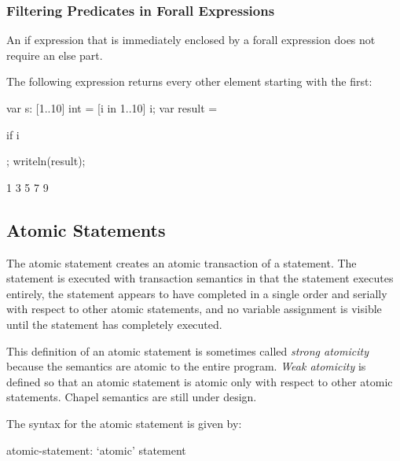 \subsubsection{Filtering Predicates in Forall Expressions}
\label{Filtering_Predicates_Forall}

An if expression that is immediately enclosed by a forall expression
does not require an else part.
\begin{example}
The following expression returns every other element starting with the
first:
\begin{chapelpre}
var s: [1..10] int = [i in 1..10] i;
var result =
\end{chapelpre}
\begin{chapel}
[i in 1..s.numElements] if i %
\end{chapel}
\begin{chapelpost}
;
writeln(result);
\end{chapelpost}
\begin{chapeloutput}
1 3 5 7 9
\end{chapeloutput}
\end{example}

\subsection{Atomic Statements}
\label{Atomic_Transactions}
\label{atomicity}

The atomic statement creates an atomic transaction of a statement. The
statement is executed with transaction semantics in that the statement
executes entirely, the statement appears to have completed in a single
order and serially with respect to other atomic statements, and no
variable assignment is visible until the statement has completely
executed.

\begin{openissue}
This definition of an atomic statement is sometimes called {\em strong
atomicity} because the semantics are atomic to the entire program.
{\em Weak atomicity} is defined so that an atomic statement is atomic
only with respect to other atomic statements.  Chapel semantics are
still under design.
\end{openissue}

The syntax for the atomic statement is given by:
\begin{syntax}
atomic-statement:
  `atomic' statement
\end{syntax}


